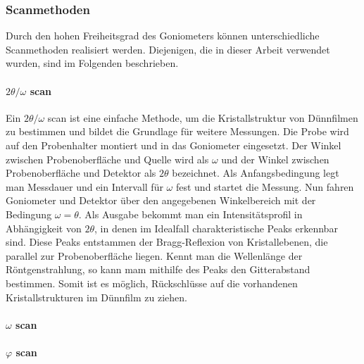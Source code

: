 \subsubsection{Scanmethoden}
Durch den hohen Freiheitsgrad des Goniometers können unterschiedliche Scanmethoden realisiert werden.
Diejenigen, die in dieser Arbeit verwendet wurden, sind im Folgenden beschrieben.

\paragraph{$2\theta/\omega$ scan}
Ein $2\theta/\omega$ scan ist eine einfache Methode, um die Kristallstruktur von Dünnfilmen zu bestimmen
und bildet die Grundlage für weitere Messungen.
Die Probe wird auf den Probenhalter montiert und in das Goniometer eingesetzt.
Der Winkel zwischen Probenoberfläche und Quelle wird als $\omega$ und der Winkel zwischen Probenoberfläche und Detektor
als $2\theta$ bezeichnet.
Als Anfangsbedingung legt man Messdauer und ein Intervall für $\omega$ fest und startet die Messung.
Nun fahren Goniometer und Detektor über den angegebenen Winkelbereich mit der Bedingung $\omega = \theta$.
Als Ausgabe bekommt man ein Intensitätsprofil in Abhängigkeit von $2\theta$, in denen im Idealfall charakteristische
Peaks erkennbar sind.
Diese Peaks entstammen der Bragg-Reflexion von Kristallebenen, die parallel zur Probenoberfläche liegen.
Kennt man die Wellenlänge der Röntgenstrahlung, so kann mam mithilfe des Peaks den Gitterabstand bestimmen.
Somit ist es möglich, Rückschlüsse auf die vorhandenen Kristallstrukturen im Dünnfilm zu ziehen.

\paragraph{$\omega$ scan}

\paragraph{$\varphi$ scan}
\newpage

